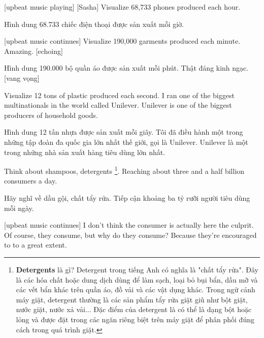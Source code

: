 \documentclass[a4paper]{article}
\begin{document}
	[upbeat music playing]
	[Sasha] Visualize 68,733 phones produced each hour.
	
	\begin{vietnamese-v2}
		 Hình dung 68.733 chiếc điện thoại được sản xuất mỗi giờ.
	\end{vietnamese-v2}
	
	[upbeat music continues]
	Visualize 190,000 garments produced each minute.
	Amazing. [echoing]
	
	\begin{vietnamese-v2}
		Hình dung 190.000 bộ quần áo được sản xuất mỗi phút. 
		Thật đáng kinh ngạc. [vang vọng]
	\end{vietnamese-v2}
	
	Visualize 12 tons of plastic produced each second. I ran one of the biggest multinationals in the world called Unilever.
	Unilever is one of the biggest producers of household goods.
	
	\begin{vietnamese-v2}
		Hình dung 12 tấn nhựa được sản xuất mỗi giây. Tôi đã điều hành một trong những tập đoàn đa quốc gia lớn nhất thế giới, gọi là Unilever. 
		Unilever là một trong những nhà sản xuất hàng tiêu dùng lớn nhất.
	\end{vietnamese-v2}
	
	\pagebreak
	
	Think about shampoos, detergents \footnote{
		\textbf{Detergents} là gì? Detergent trong tiếng Anh có nghĩa là "chất tẩy rửa". Đây là các hóa chất hoặc dung dịch dùng để làm sạch, loại bỏ bụi bẩn, dầu mỡ và các vết bẩn khác trên quần áo, đồ vải và các vật dụng khác. Trong ngữ cảnh máy giặt, detergent thường là các sản phẩm tẩy rửa giặt giũ như bột giặt, nước giặt, nước xả vải... Đặc điểm của detergent là có thể là dạng bột hoặc lỏng và được đặt trong các ngăn riêng biệt trên máy giặt để phân phối đúng cách trong quá trình giặt.
	
	}. Reaching about three and a half billion consumers a day.
	
	\begin{vietnamese-v2}
		Hãy nghĩ về dầu gội, chất tẩy rửa. Tiếp cận khoảng ba tỷ rưỡi người tiêu dùng mỗi ngày.
	\end{vietnamese-v2}
	
	[upbeat music continues]
	I don't think the consumer is actually here the culprit.
	Of course, they consume, but why do they consume?
	Because they're encouraged to to a great extent.
	
\end{document}
